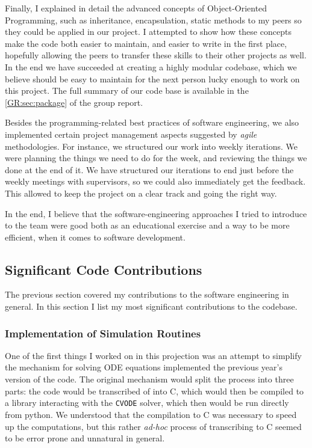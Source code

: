 Finally, I explained in detail the advanced concepts of Object-Oriented Programming, such as inheritance, encapsulation, static methods to my peers so they could be applied in our project.
I attempted to show how these concepts make the code both easier to maintain, and easier to write in the first place, hopefully allowing the peers to transfer these skills to their other projects as well.
In the end we have succeeded at creating a highly modular codebase, which we believe should be easy to maintain for the next person lucky enough to work on this project. The full summary of our code base is available in the \autoref*{GR:sec:package} of the group report.

Besides the programming-related best practices of software engineering, we also implemented certain project management aspects suggested by \emph{agile} methodologies. 
For instance, we structured our work into weekly iterations. We were planning the things we need to do for the week, and reviewing the things we done at the end of it. 
We have structured our iterations to end just before the weekly meetings with supervisors, so we could also immediately get the feedback.
This allowed to keep the project on a clear track and going the right way.


In the end, I believe that the software-engineering approaches I tried to introduce to the team were good both as an educational exercise and a way to be more efficient, when it comes to software development.

\subsection{Significant Code Contributions}

The previous section covered my contributions to the software engineering in general.
In this section I list my most significant contributions to the codebase.

\subsubsection{Implementation of Simulation Routines}

One of the first things I worked on in this projection was an attempt to simplify the mechanism for solving ODE equations implemented the previous year's version of the code. 
The original mechanism would split the process into three parts: the \python{} code would be transcribed of into C, which would then be compiled to a library interacting with the \verb"CVODE" solver\cite{hindmarsh_sundials_2005}, which then would be run directly from python.
We understood that the compilation to C was necessary to speed up the computations, but this rather \emph{ad-hoc} process of transcribing \py{} to C seemed to be error prone and unnatural in general.  

